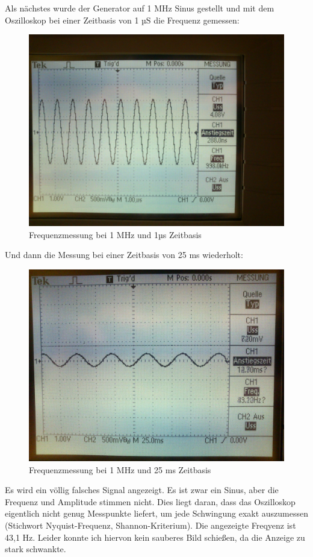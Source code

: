 Als nächstes wurde der Generator auf 1 MHz Sinus gestellt und mit dem Oszilloskop bei einer Zeitbasis von 1 µS die Frequenz gemessen:
\begin{figure}[H]
	\centering
	\includegraphics[width=\linewidth]{versuch3/oszi/DSC_0253.JPG}
	\caption{Frequenzmessung bei 1 MHz und 1µs Zeitbasis}
\end{figure}
Und dann die Messung bei einer Zeitbasis von 25 ms wiederholt:
\begin{figure}[H]
	\centering
	\includegraphics[width=\linewidth]{versuch3/oszi/DSC_0254.JPG}
	\caption{Frequenzmessung bei 1 MHz und 25 ms Zeitbasis}
\end{figure}
Es wird ein völlig falsches Signal angezeigt. Es ist zwar ein Sinus, aber die Frequenz und Amplitude stimmen nicht. Dies liegt daran, dass das Oszilloskop eigentlich nicht genug Messpunkte liefert, um jede Schwingung exakt auszumessen (Stichwort Nyquist-Frequenz, Shannon-Kriterium). Die angezeigte Freqyenz ist 43,1 Hz. Leider konnte ich hiervon kein sauberes Bild schießen, da die Anzeige zu stark schwankte.

